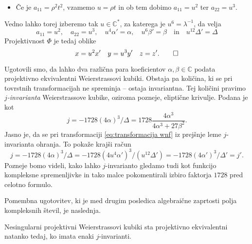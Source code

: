 \documentclass[mat1]{fmfdelo}
\numberwithin{equation}{section}
\newcommand{\C}{\mathbb C}
\newcommand{\CM}{\mathbb C ^*}
\newcommand{\inv}{^{-1}}
\theoremstyle{definition}
\begin{document}
\begin{dokaz}
\begin{itemize}
        \item Če je $a_{11} = \rho^2 t^2$, vzamemo $u = \rho t$ in ob tem dobimo $a_{11} = u^2$ ter $a_{22} = u^3$.
    \end{itemize}
    Vedno lahko torej izberemo tak $u \in \CM$, za katerega je $u^6 = \lambda\inv$, da velja
    \[
        a_{11} = u^2, \quad a_{22} = u^3, \quad u^4\alpha' = \alpha, \quad u^6 \beta' = \beta \quad \text{in} \quad u^{12} \Delta' = \Delta
    \]
    Projektivnost $\Phi$ je tedaj oblike
    \[
        x = u^2 x' \quad y = u^3 y' \quad z = z'. \qedhere
    \]
\end{dokaz}

Ugotovili smo, da lahko dva različna para koeficientov $\alpha, \beta \in \C$ podata projektivno ekvivalentni Weierstrassovi kubiki. Obstaja pa količina, ki se pri tovrstnih transformacijah ne spreminja -- ostaja invariantna. Tej količini pravimo \emph{$j$-invarianta} Weierstrassove kubike, oziroma pozneje, eliptične krivulje. Podana je kot 
\[
    j = -1728(4\alpha)^3/\Delta = 1728\frac{4\alpha^3}{4\alpha^3 + 27\beta^2}.  
\] 
Jasno je, da se pri transformaciji \eqref{eq:transformacija wnf} iz prejšnje leme $j$-invarianta ohranja. To pokaže krajši račun
\[
    j = -1728(4\alpha)^3/\Delta = -1728(4u^4\alpha')^3/(u^{12}\Delta') = -1728(4\alpha')^3/\Delta' = j'.
\]
Pozneje bomo videli, kako lahko $j$-invarianto gledamo tudi kot funkcijo kompleksne spremenljivke in tako malce pokomentirali 
izbiro faktorja $1728$ pred celotno formulo.

Pomembna ugotovitev, ki je med drugim posledica algebraične zaprtosti polja kompleksnih števil, je naslednja. 

\begin{trditev}
    \label{proj ekviv iff j enaki}
    Nesingularni projektivni Weierstrassovi kubiki sta projektivno ekvivalentni natanko tedaj, ko imata enaki $j$-invarianti.
\end{trditev}
\end{document}
